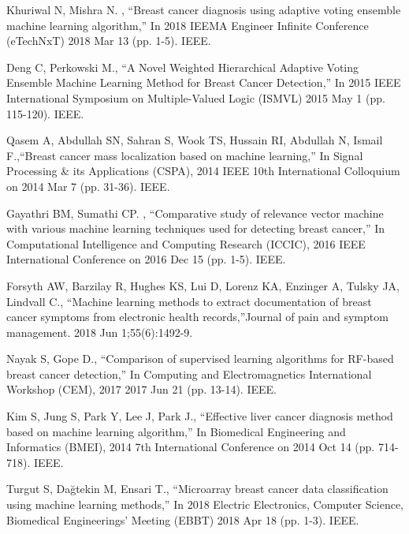 \documentclass[conference]{IEEEtran}
\begin{document}
\begin{thebibliography}{00}
%

 Khuriwal N, Mishra N. , ``Breast cancer diagnosis using adaptive voting ensemble machine learning algorithm,'' In 2018 IEEMA Engineer Infinite Conference (eTechNxT) 2018 Mar 13 (pp. 1-5). IEEE.

 Deng C, Perkowski M., ``A Novel Weighted Hierarchical Adaptive Voting Ensemble Machine Learning Method for Breast Cancer Detection,'' In 2015 IEEE International Symposium on Multiple-Valued Logic (ISMVL) 2015 May 1 (pp. 115-120). IEEE.

 Qasem A, Abdullah SN, Sahran S, Wook TS, Hussain RI, Abdullah N, Ismail F.,``Breast cancer mass localization based on machine learning,'' In Signal Processing \& its Applications (CSPA), 2014 IEEE 10th International Colloquium on 2014 Mar 7 (pp. 31-36). IEEE.

 Gayathri BM, Sumathi CP. , ``Comparative study of relevance vector machine with various machine learning techniques used for detecting breast cancer,'' In Computational Intelligence and Computing Research (ICCIC), 2016 IEEE International Conference on 2016 Dec 15 (pp. 1-5). IEEE.
  
 Forsyth AW, Barzilay R, Hughes KS, Lui D, Lorenz KA, Enzinger A, Tulsky JA, Lindvall C., ``Machine learning methods to extract documentation of breast cancer symptoms from electronic health records,''Journal of pain and symptom management. 2018 Jun 1;55(6):1492-9.

 Nayak S, Gope D., ``Comparison of supervised learning algorithms for RF-based breast cancer detection,'' In Computing and Electromagnetics International Workshop (CEM), 2017 2017 Jun 21 (pp. 13-14). IEEE.

 Kim S, Jung S, Park Y, Lee J, Park J., ``Effective liver cancer diagnosis method based on machine learning algorithm,'' In Biomedical Engineering and Informatics (BMEI), 2014 7th International Conference on 2014 Oct 14 (pp. 714-718). IEEE.

 Turgut S, Dağtekin M, Ensari T., ``Microarray breast cancer data classification using machine learning methods,'' In 2018 Electric Electronics, Computer Science, Biomedical Engineerings' Meeting (EBBT) 2018 Apr 18 (pp. 1-3). IEEE.


\end{thebibliography}
\end{document}
